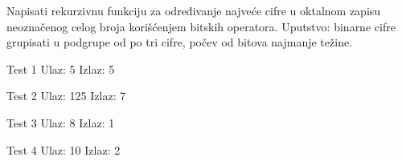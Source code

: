 \begin{Exercise}[label=119]
Napisati rekurzivnu funkciju za određivanje
najveće cifre u oktalnom zapisu
neoznačenog celog broja korišćenjem bitskih operatora.
Uputstvo: binarne cifre grupisati u podgrupe od po tri cifre,
počev od bitova najmanje težine.

\begin{minitest}
\begin{test}{Test 1}
Ulaz:  5
Izlaz: 5
\end{test}
\end{minitest}
\begin{minitest}
\begin{test}{Test 2}
Ulaz:  125
Izlaz: 7
\end{test}
\end{minitest}
\begin{minitest}
\begin{test}{Test 3}
Ulaz:  8
Izlaz: 1
\end{test}
\end{minitest}

\begin{minitest}
\begin{test}{Test 4}
Ulaz:  10
Izlaz: 2
\end{test}
\end{minitest}

\end{Exercise}
\begin{Answer}[ref=119]
\end{Answer}

